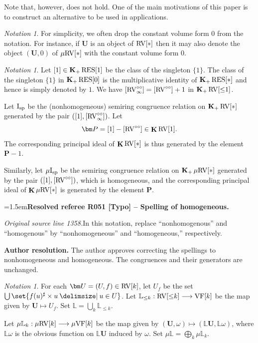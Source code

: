 \documentclass[12pt]{amsart}
\newcommand{\ResolvedRefereeRemark}[5]{%
  \par\medskip\begingroup\normalfont\small\color{gray}%
  \emergencystretch=1.5em\noindent\textbf{Resolved referee R#1 [#2] -- #3.}\par\nobreak\noindent #4\par
  \medskip\color{ResolutionGreen}\noindent\textbf{Author resolution.} #5\par
  \endgroup\medskip
}
\theoremstyle{plain}
\theoremstyle{definition}
\theoremstyle{remark}
\newtheorem{nota}[thm]{Notation}
\numberwithin{equation}{section}
\theoremstyle{plain}
\newcommand{\VF}{\textup{VF}}
\newcommand{\RV}{\textup{RV}}
\newcommand{\0}{\emptyset}
\newcommand{\bb}[1]{\mathbb{#1}}
\newcommand{\fun}{\longrightarrow}
\newcommand{\efun}{\longmapsto}
\providecommand\given{}
\newcommand\SetSymbol[1][]{%
\nonscript \: #1 \vert
\allowbreak
\nonscript\:
\mathopen{}}
\renewcommand\given{\SetSymbol[\delimsize]}
\newcommand{\mgVF}{{\mu} {\VF}}
\newcommand{\mgRV}{{\mu}{\RV}}
\newcommand{\RES}{\textup{RES}}
\newcommand{\isp}{\textup{I}_{\textup{sp}}}
\newcommand{\mgisp}{\mu \isp}
\newcommand{\mgL}{{\mu}{\bb L}}
\DeclareMathOperator{\gsk}{\mathbf{K}_+}
\DeclareMathOperator{\ggk}{\mathbf{K}}
\newcommand{\ccirc}{\circ \circ}
\begin{document}
Note that, however, \cite[Proposition~10.10(2)]{hrushovski:kazhdan:integration:vf} does not hold. One of the main motivations of this paper is to construct an alternative to be used in applications.

\begin{nota}\label{drop:0}
For simplicity, we often drop the constant volume form $0$ from the notation. For instance, if $\bm U$ is an object of $\RV[*]$ then it may also denote the  object $(\bm U, 0)$ of $\mgRV[*]$ with the constant volume form $0$.
\end{nota}

\begin{nota}
Let $[1] \in \gsk \RES[1]$ be the class of the singleton $\{1\}$. The class of the singleton $\{1\}$ in $\gsk \RES[0]$ is the multiplicative identity of $\gsk \RES[*]$ and hence is simply denoted by $1$. We have $[\RV^{\circ\circ}_\infty] = [\RV^{\circ\circ}] + 1$ in $\gsk \RV[{\leq} 1]$.

Let $\isp$ be the (nonhomogeneous) semiring congruence relation on $\gsk \RV[*]$ generated by the pair $([1], [\RV^{\circ\circ}_\infty])$. Let
\[
\bm P = [1]-[\RV^{\ccirc}]  \in \ggk \RV[1].
\]
The corresponding principal ideal of $\ggk \RV[*]$ is thus generated by the element $\bm P - 1$.


Similarly, let $\mgisp$ be the  semiring congruence relation on $\gsk \mgRV[*]$ generated by the pair $([1], [\RV^{\circ\circ}])$, which is homogeneous, and the corresponding principal ideal of $\ggk \mgRV[*]$ is generated by the element $\bm P$.
\end{nota}

\ResolvedRefereeRemark{051}{Typo}{Spelling of homogeneous}{%
\textit{Original source line 1358.}\quad In this notation, replace ``nonhomogenous'' and ``homogenous'' by ``nonhomogeneous'' and ``homogeneous,'' respectively.
}{The author approves correcting the spellings to nonhomogeneous and homogeneous. The congruences and their generators are unchanged.}

\begin{nota}\label{RVcat:tag}
For each  $\bm U = (U, f) \in  \RV[k]$, let $U_f$ be the set $\bigcup \set{f(u)^\sharp \times u \given u \in U}$. Let $\mathbb{L}_{\leq k}: \RV[{\leq}k] \fun \VF[k]$ be the map  given by $\bm U \efun U_f$. Set $\bb L = \bigcup_k \bb L_{\leq k}$.

Let $\mgL_k: \mgRV[k] \fun \mgVF[k]$ be the map given by $(\bm U, \omega) \efun (\bb L \bm U, \bb L \omega)$, where $\bb L \omega$ is the obvious function on $\bb L \bm U$ induced by $\omega$. Set $\mgL = \bigoplus_k \mgL_{k}$.
\end{nota}
\end{document}

